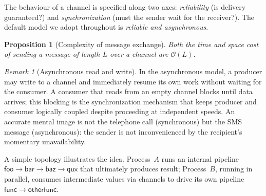 \documentclass[11pt,a4paper]{article}
\theoremstyle{definition}
\theoremstyle{remark}
\newtheorem*{remark}{Remark}
\theoremstyle{plain}
\newtheorem{proposition}[definition]{Proposition}
\newcommand{\bigO}{\mathcal{O}}
\begin{document}
The behaviour of a channel is specified along two axes:
\emph{reliability} (is delivery guaranteed?) and \emph{synchronization}
(must the sender wait for the receiver?). The default model we adopt
throughout is \emph{reliable and asynchronous}.

\begin{proposition}[Complexity of message exchange]
Both the time and space cost of sending a message of length $L$ over a
channel are $\bigO(L)$.
\end{proposition}

\begin{remark}[Asynchronous read and write]
In the asynchronous model, a producer may write to a channel and
immediately resume its own work without waiting for the consumer. A
consumer that reads from an empty channel blocks until data arrives; this
blocking is the synchronization mechanism that keeps producer and consumer
logically coupled despite proceeding at independent speeds. An accurate
mental image is not the telephone call (synchronous) but the SMS message
(asynchronous): the sender is not inconvenienced by the recipient's
momentary unavailability.
\end{remark}

A simple topology illustrates the idea. Process~$A$ runs an internal
pipeline $\mathsf{foo} \to \mathsf{bar} \to \mathsf{baz} \to \mathsf{qux}$
that ultimately produces \textsf{result}; Process~$B$, running in
parallel, consumes intermediate values via channels to drive its own
pipeline $\mathsf{func} \to \mathsf{otherfunc}$.

\begin{center}
\end{center}
\end{document}
